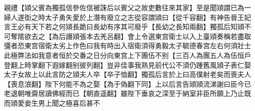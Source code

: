 親禮【熲父賓為獨孤信參佐信被誅后以賓父之故吏數往來其家】至是聞熲謂已為一婦人遂衘之時太子勇失愛於上潛有廢立之志從容謂熲曰【從千容翻】有神告晉王妃言王必有天下若之何熲長跪曰長幼有序其可廢乎【長幼之長知兩翻】獨孤后知熲不可奪隂欲去之【為后譖熲張本去羌呂翻】會上令選東宫衛士以入上臺熲奏稱若盡取彊者恐東宫宿衛太劣上作色曰我有時出入宿衛須得勇毅太子毓德春宫左右何須壯士此極弊法如我意者恒於交番之日分向東宫上下團伍不别【三百人為團五人為伍恒戶登翻上時掌翻下遐嫁翻别彼列翻】豈非佳事我熟見前代公不須仍踵舊風熲子表仁娶太子女故上以此言防之熲夫人卒【卒子恤翻】獨孤后言於上曰高僕射老矣而喪夫人【喪息浪翻】陛下何能不為之娶【為于偽翻下同】上以后言告熲熲流涕謝曰臣今已老退朝唯齋居讀佛經而已【朝直遥翻】雖陛下垂哀之深至于納室非臣所願上乃止既而熲愛妾生男上聞之極喜后甚不